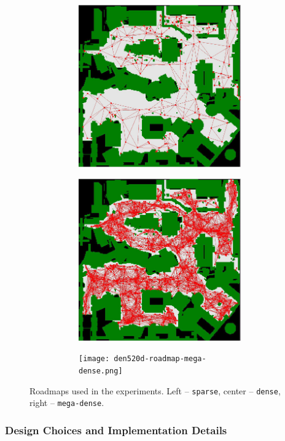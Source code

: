 \documentclass[review]{elsarticle}
\begin{document}
\begin{figure}[t]
\centering
\begin{subfigure}
    \centering
    \begin{subfigure}
        \centering
        \includegraphics[width=0.3\linewidth]{den520d-roadmap-sparse.png}
    \end{subfigure}\hspace{0.025\linewidth}%
    \begin{subfigure}
        \centering
        \includegraphics[width=0.3\linewidth]{den520d-roadmap-dense.png}
    \end{subfigure}\hspace{0.025\linewidth}%
        \begin{subfigure}
        \centering
        \texttt{[image: den520d-roadmap-mega-dense.png]}
    \end{subfigure}%
\end{subfigure}

\caption{Roadmaps used in the experiments. Left -- \texttt{sparse}, center -- \texttt{dense}, right -- \texttt{mega-dense}.}
\label{fig:roadmaps}
\end{figure}

\subsubsection{Design Choices and Implementation Details}
\end{document}
